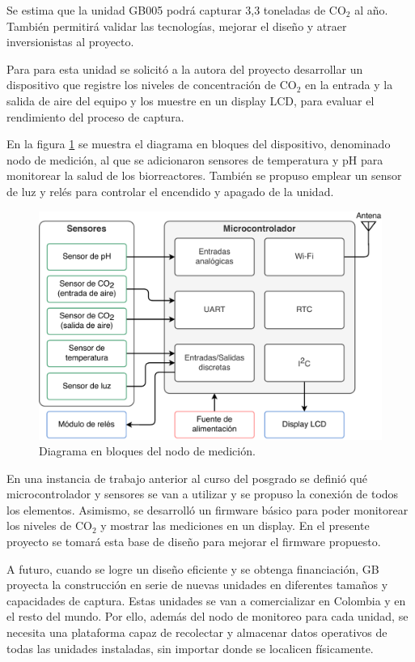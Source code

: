 \documentclass[
11pt, %
]{charter}
\begin{document}
Se estima que la unidad GB005 podrá capturar 3,3 toneladas de CO$_2$ al año. También permitirá validar las tecnologías, mejorar el diseño y atraer inversionistas al proyecto.

Para para esta unidad se solicitó a la autora del proyecto desarrollar un dispositivo que registre los niveles de concentración de CO$_2$ en la entrada y la salida de aire del equipo y los muestre en un display LCD, para evaluar el rendimiento del proceso de captura. 

En la figura \ref{fig:diagNodo} se muestra el diagrama en bloques del dispositivo, denominado nodo de medición, al que se adicionaron sensores de temperatura y pH para monitorear la salud de los biorreactores. También se propuso emplear un sensor de luz y relés para controlar el encendido y apagado de la unidad. 

\begin{figure}[htpb]
\centering 
\includegraphics[width=.65\textwidth]{./Figuras/dgNodo.pdf}
\caption{Diagrama en bloques del nodo de medición.}
\label{fig:diagNodo}
\end{figure}

En una instancia de trabajo anterior al curso del posgrado se definió qué microcontrolador y sensores se van a utilizar y se propuso la conexión de todos los elementos. Asimismo, se desarrolló un firmware básico para poder monitorear los niveles de CO$_2$ y mostrar las mediciones en un display. En el presente proyecto se tomará esta base de diseño para mejorar el firmware propuesto.

A futuro, cuando se logre un diseño eficiente y se obtenga financiación, GB proyecta la construcción en serie de nuevas unidades en diferentes tamaños y capacidades de captura. Estas unidades se van a comercializar en Colombia y en el resto del mundo. Por ello, además del nodo de monitoreo para cada unidad, se necesita una plataforma capaz de recolectar y almacenar datos operativos de todas las unidades instaladas, sin importar donde se localicen físicamente.
\end{document}
